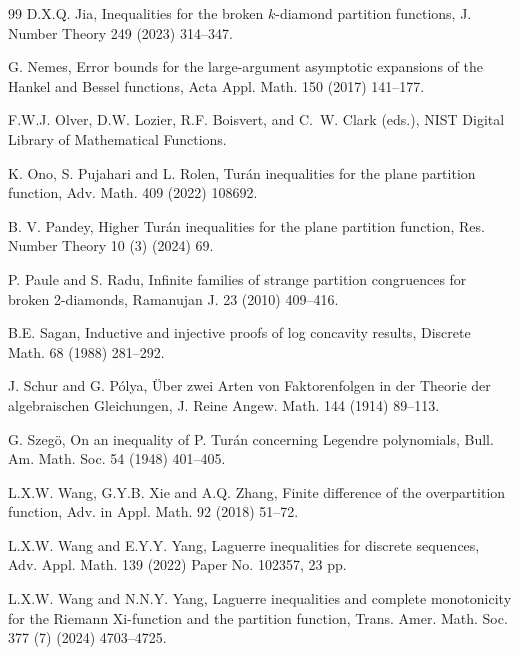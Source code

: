 \documentclass[12pt]{article}
\numberwithin{equation}{section}
\begin{document}
\begin{thebibliography}{99}
D.X.Q. Jia, Inequalities for the broken $k$-diamond partition functions, J. Number Theory 249 (2023) 314--347.

G. Nemes, Error bounds for the large-argument asymptotic expansions of the Hankel and Bessel functions, Acta Appl. Math. 150 (2017) 141--177.

F.W.J. Olver, D.W. Lozier, R.F. Boisvert, and C.~W. Clark (eds.),
NIST Digital Library of Mathematical Functions.

K. Ono, S. Pujahari and L. Rolen, Tur\'an inequalities for the plane partition function,  Adv. Math. 409 (2022) 108692.

B. V. Pandey, Higher Tur\'an inequalities for the plane partition function, Res. Number Theory 10 (3) (2024) 69.

P. Paule and S. Radu,  Infinite families of strange partition congruences for broken 2-diamonds, Ramanujan J. 23 (2010) 409--416.


B.E. Sagan, Inductive and injective proofs of log concavity results, Discrete Math. 68 (1988) 281--292.

J. Schur and G. P\'{o}lya,
\"{Uber} zwei Arten von Faktorenfolgen in der Theorie der algebraischen Gleichungen, J. Reine Angew. Math. 144 (1914) 89--113.	

G. Szeg\"o, On an inequality of P. Tur\'an concerning Legendre polynomials, Bull. Am. Math. Soc. 54 (1948) 401--405.

L.X.W. Wang, G.Y.B. Xie and A.Q. Zhang, Finite difference of the overpartition function, Adv. in Appl. Math. 92 (2018) 51--72.

L.X.W. Wang and E.Y.Y. Yang,
Laguerre inequalities for discrete sequences,
Adv. Appl. Math. 139 (2022) Paper No. 102357, 23 pp.

	
L.X.W. Wang and N.N.Y. Yang, Laguerre inequalities and complete
monotonicity for the Riemann Xi-function and the partition function, Trans. Amer. Math. Soc. 377 (7) (2024) 4703--4725.


\end{thebibliography}
\end{document}
